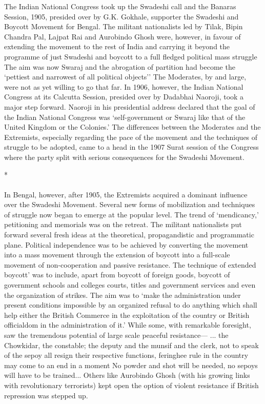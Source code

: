 The Indian National Congress took up the Swadeshi call and the Banaras Session, 1905, presided over by G.K. Gokhale, supporter the Swadeshi and Boycott Movement for Bengal. The militant nationalists led by Tilak, Bipin Chandra Pal, Lajpat Rai and Aurobindo Ghosh were, however, in favour of extending the movement to the rest of India and carrying it beyond the programme of just Swadeshi and boycott to a full fledged political mass struggle The aim was now Swaraj and the abrogation of partition had become the `pettiest and narrowest of all political objects'' The Moderates, by and large, were not as yet willing to go that far. In 1906, however, the Indian National Congress at its Calcutta Session, presided over by Dadabhai Naoroji, took a major step forward. Naoroji in his presidential address declared that the goal of the Indian National Congress was `self-government or Swaraj like that of the United Kingdom or the Colonies.' The differences between the Moderates and the Extremists, especially regarding the pace of the movement and the techniques of struggle to be adopted, came to a head in the 1907 Surat session of the Congress where the party split with serious consequences for the Swadeshi Movement.

\begin{center}*\end{center}

\paragraph*{}

In Bengal, however, after 1905, the Extremists acquired a dominant influence over the Swadeshi Movement. Several new forms of mobilization and techniques of struggle now began to emerge at the popular level. The trend of `mendicancy,' petitioning and memorials was on the retreat. The militant nationalists put forward several fresh ideas at the theoretical, propagandistic and programmatic plane. Political independence was to be achieved by converting the movement into a mass movement through the extension of boycott into a full-scale movement of non-cooperation and passive resistance. The technique of extended boycott' was to include, apart from boycott of foreign goods, boycott of government schools and colleges courts, titles and government services and even the organization of strikes. The aim was to `make the administration under present conditions impossible by an organized refusal to do anything which shall help either the British Commerce in the exploitation of the country or British officialdom in the administration of it.' While some, with remarkable foresight, saw the tremendous potential of large scale peaceful resistance--- ... the Chowkidar, the constable; the deputy and the munsif and the clerk, not to speak of the sepoy all resign their respective functions, feringhee rule in the country may come to an end in a moment No powder and shot will be needed, no sepoys will have to be trained... Others like Aurobindo Ghosh (with his growing links with revolutionary terrorists) kept open the option of violent resistance if British repression was stepped up.

